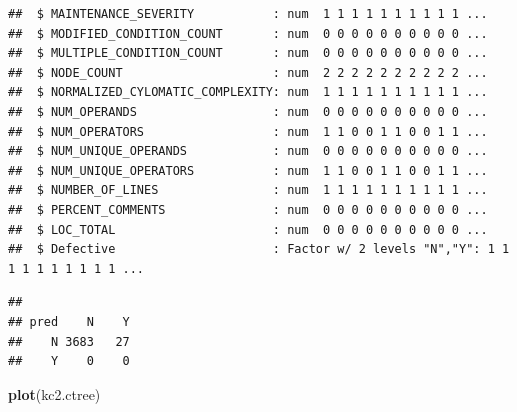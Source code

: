 \documentclass[]{book}
\newenvironment{Shaded}{\begin{snugshade}}{\end{snugshade}}
\newcommand{\KeywordTok}[1]{\textcolor[rgb]{0.13,0.29,0.53}{\textbf{{#1}}}}
\newcommand{\DataTypeTok}[1]{\textcolor[rgb]{0.13,0.29,0.53}{{#1}}}
\newcommand{\DecValTok}[1]{\textcolor[rgb]{0.00,0.00,0.81}{{#1}}}
\newcommand{\StringTok}[1]{\textcolor[rgb]{0.31,0.60,0.02}{{#1}}}
\newcommand{\CommentTok}[1]{\textcolor[rgb]{0.56,0.35,0.01}{\textit{{#1}}}}
\newcommand{\OtherTok}[1]{\textcolor[rgb]{0.56,0.35,0.01}{{#1}}}
\newcommand{\NormalTok}[1]{{#1}}
\begin{document}
\begin{verbatim}
##  $ MAINTENANCE_SEVERITY           : num  1 1 1 1 1 1 1 1 1 1 ...
##  $ MODIFIED_CONDITION_COUNT       : num  0 0 0 0 0 0 0 0 0 0 ...
##  $ MULTIPLE_CONDITION_COUNT       : num  0 0 0 0 0 0 0 0 0 0 ...
##  $ NODE_COUNT                     : num  2 2 2 2 2 2 2 2 2 2 ...
##  $ NORMALIZED_CYLOMATIC_COMPLEXITY: num  1 1 1 1 1 1 1 1 1 1 ...
##  $ NUM_OPERANDS                   : num  0 0 0 0 0 0 0 0 0 0 ...
##  $ NUM_OPERATORS                  : num  1 1 0 0 1 1 0 0 1 1 ...
##  $ NUM_UNIQUE_OPERANDS            : num  0 0 0 0 0 0 0 0 0 0 ...
##  $ NUM_UNIQUE_OPERATORS           : num  1 1 0 0 1 1 0 0 1 1 ...
##  $ NUMBER_OF_LINES                : num  1 1 1 1 1 1 1 1 1 1 ...
##  $ PERCENT_COMMENTS               : num  0 0 0 0 0 0 0 0 0 0 ...
##  $ LOC_TOTAL                      : num  0 0 0 0 0 0 0 0 0 0 ...
##  $ Defective                      : Factor w/ 2 levels "N","Y": 1 1 1 1 1 1 1 1 1 1 ...
\end{verbatim}

\begin{Shaded}
\end{Shaded}

\begin{verbatim}
##     
## pred    N    Y
##    N 3683   27
##    Y    0    0
\end{verbatim}

\begin{Shaded}
\begin{Highlighting}[]
\KeywordTok{plot}\NormalTok{(kc2.ctree)}
\end{Highlighting}
\end{Shaded}
\end{document}
